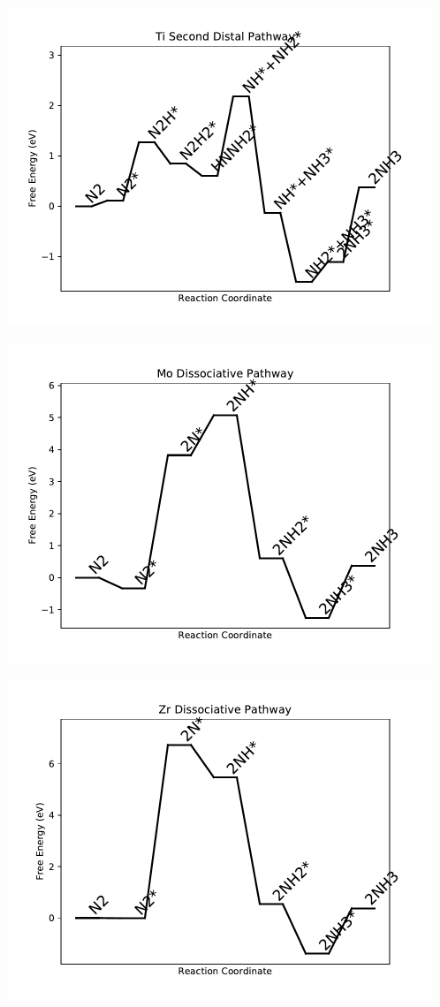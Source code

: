 \begin{figure}
\centering
\includegraphics[width=0.8\linewidth]{data/plots/Ti_distal_2.pdf}
\end{figure}

\begin{figure}
\centering
\includegraphics[width=0.8\linewidth]{data/plots/Mo_dissociative.pdf}
\end{figure}

\begin{figure}
\centering
\includegraphics[width=0.8\linewidth]{data/plots/Zr_dissociative.pdf}
\end{figure}

